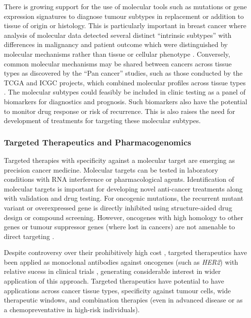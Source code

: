 There is growing support for the use of molecular tools such as mutations or gene expression signatures to diagnose tumour subtypes in replacement or addition to tissue of origin or histology. This is particularly important in breast cancer where analysis of molecular data detected several distinct ``intrinsic subtypes'' with differences in malignancy and patient outcome which were distinguished by molecular mechanisms rather than tissue or cellular phenotype \citep{Perou2000, Parker2009}. Conversely, common molecular mechanisms may be shared between cancers across tissue types as discovered by the ``Pan cancer'' studies, such as those conducted by the TCGA and ICGC projects, which combined molecular profiles across tissue types \citet{TCGA2013PAN}. The molecular subtypes could feasibly be included in clinic testing as a panel of biomarkers for diagnostics and prognosis. Such biomarkers also have the potential to monitor drug response or risk of recurrence. This is also raises the need for development of treatments for targeting these molecular subtypes.  

\subsubsection{Targeted Therapeutics and Pharmacogenomics}
Targeted therapies with specificity against a molecular target are emerging as precision cancer medicine. Molecular targets can be tested in laboratory conditions with RNA interference or pharmacological agents. Identification of molecular targets is important for developing novel anti-cancer treatments along with validation and drug testing. For oncogenic mutations, the recurrent mutant variant or overexpressed gene is directly inhibited using structure-aided drug design or compound screening. However, oncogenes with high homology to other genes or tumour suppressor genes (where lost in cancers) are not amenable to direct targeting \citep{Kaelin2009}.



Despite controversy over their prohibitively high cost \citep{Pharmac2016}, targeted therapeutics have been applied as monoclonal antibodies against oncogenes (such as \textit{HER2}) with relative sucess in clinical trials \citep{Miles2001}, generating considerable interest in wider application of this approach. Targeted therapeutics have potential to have applications across cancer tissue types, specificity against tumour cells, wide therapeutic windows, and combination therapies (even in advanced disease or as a chemopreventative in high-risk individuals).

